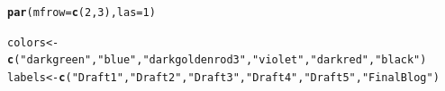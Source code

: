 \documentclass{article}\usepackage[]{graphicx}\usepackage[]{color}
\makeatletter
\newcommand{\hlnum}[1]{\textcolor[rgb]{0.686,0.059,0.569}{#1}}%
\newcommand{\hlstr}[1]{\textcolor[rgb]{0.192,0.494,0.8}{#1}}%
\newcommand{\hlstd}[1]{\textcolor[rgb]{0.345,0.345,0.345}{#1}}%
\newcommand{\hlkwb}[1]{\textcolor[rgb]{0.69,0.353,0.396}{#1}}%
\newcommand{\hlkwc}[1]{\textcolor[rgb]{0.333,0.667,0.333}{#1}}%
\newcommand{\hlkwd}[1]{\textcolor[rgb]{0.737,0.353,0.396}{\textbf{#1}}}%
\newenvironment{kframe}{%
 \def\at@end@of@kframe{}%
 \ifinner\ifhmode%
  \def\at@end@of@kframe{\end{minipage}}%
  \begin{minipage}{\columnwidth}%
 \fi\fi%
 \def\FrameCommand##1{\hskip\@totalleftmargin \hskip-\fboxsep
 \colorbox{shadecolor}{##1}\hskip-\fboxsep
     \hskip-\linewidth \hskip-\@totalleftmargin \hskip\columnwidth}%
 \MakeFramed {\advance\hsize-\width
   \@totalleftmargin\z@ \linewidth\hsize
   \@setminipage}}%
 {\par\unskip\endMakeFramed%
 \at@end@of@kframe}
\newenvironment{knitrout}{}{} %
\makeatother
\begin{document}
\begin{knitrout}
\color{fgcolor}\begin{kframe}
\begin{alltt}
\hlkwd{par}\hlstd{(}\hlkwc{mfrow}\hlstd{=}\hlkwd{c}\hlstd{(}\hlnum{2}\hlstd{,}\hlnum{3}\hlstd{),} \hlkwc{las}\hlstd{=}\hlnum{1}\hlstd{)}

\hlstd{colors} \hlkwb{<-} \hlkwd{c}\hlstd{(}\hlstr{"darkgreen"}\hlstd{,} \hlstr{"blue"}\hlstd{,} \hlstr{"darkgoldenrod3"}\hlstd{,} \hlstr{"violet"}\hlstd{,} \hlstr{"darkred"}\hlstd{,} \hlstr{"black"}\hlstd{)}
\hlstd{labels} \hlkwb{<-} \hlkwd{c}\hlstd{(}\hlstr{"Draft 1"}\hlstd{,} \hlstr{"Draft 2"}\hlstd{,} \hlstr{"Draft 3"}\hlstd{,} \hlstr{"Draft 4"}\hlstd{,} \hlstr{"Draft 5"}\hlstd{,} \hlstr{"Final Blog"}\hlstd{)}


\end{alltt}
\end{kframe}
\end{knitrout}
\end{document}
